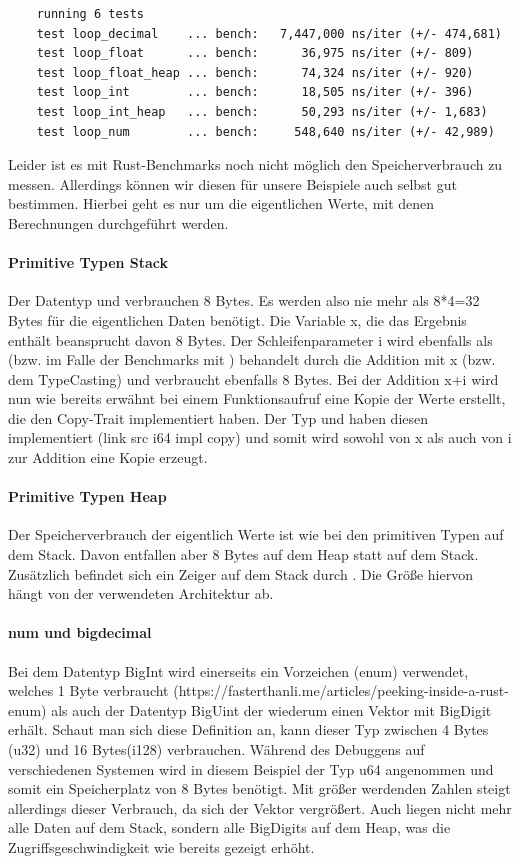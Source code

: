 \documentclass[11pt,a4paper, ngerman]{article}
\begin{document}
\begin{verbatim}
    running 6 tests
    test loop_decimal    ... bench:   7,447,000 ns/iter (+/- 474,681)
    test loop_float      ... bench:      36,975 ns/iter (+/- 809)
    test loop_float_heap ... bench:      74,324 ns/iter (+/- 920)
    test loop_int        ... bench:      18,505 ns/iter (+/- 396)
    test loop_int_heap   ... bench:      50,293 ns/iter (+/- 1,683)
    test loop_num        ... bench:     548,640 ns/iter (+/- 42,989)
\end{verbatim}

Leider ist es mit Rust-Benchmarks noch nicht möglich den Speicherverbrauch zu messen. Allerdings können wir diesen für unsere Beispiele auch selbst gut bestimmen. Hierbei geht es nur um die eigentlichen Werte, mit denen Berechnungen durchgeführt werden.

\paragraph{Primitive Typen Stack} Der Datentyp  und  verbrauchen 8 Bytes. Es werden also nie mehr als 8*4=32 Bytes für die eigentlichen Daten benötigt. Die Variable x, die das Ergebnis enthält beansprucht davon 8 Bytes. Der Schleifenparameter i wird ebenfalls als  (bzw.  im Falle der Benchmarks mit ) behandelt durch die Addition mit x (bzw. dem TypeCasting) und verbraucht ebenfalls 8 Bytes. Bei der Addition x+i wird nun wie bereits erwähnt bei einem Funktionsaufruf eine Kopie der Werte erstellt, die den Copy-Trait implementiert haben. Der Typ  und  haben diesen implementiert (link src i64 impl copy) und somit wird sowohl von x als auch von i zur Addition eine Kopie erzeugt.

\paragraph{Primitive Typen Heap} Der Speicherverbrauch der eigentlich Werte ist wie bei den primitiven Typen auf dem Stack. Davon entfallen aber 8 Bytes auf dem Heap statt auf dem Stack. Zusätzlich befindet sich ein Zeiger auf dem Stack durch . Die Größe hiervon hängt von der verwendeten Architektur ab.

\paragraph{num und bigdecimal} Bei dem Datentyp BigInt wird einerseits ein Vorzeichen (enum) verwendet, welches 1 Byte verbraucht (https://fasterthanli.me/articles/peeking-inside-a-rust-enum) als auch der Datentyp BigUint der wiederum einen Vektor mit BigDigit erhält. Schaut man sich diese Definition an, kann dieser Typ zwischen 4 Bytes (u32) und 16 Bytes(i128) verbrauchen. Während des Debuggens auf verschiedenen Systemen wird in diesem Beispiel der Typ u64 angenommen und somit ein Speicherplatz von 8 Bytes benötigt. Mit größer werdenden Zahlen steigt allerdings dieser Verbrauch, da sich der Vektor vergrößert. Auch liegen nicht mehr alle Daten auf dem Stack, sondern alle BigDigits auf dem Heap, was die Zugriffsgeschwindigkeit wie bereits gezeigt erhöht.
\end{document}
